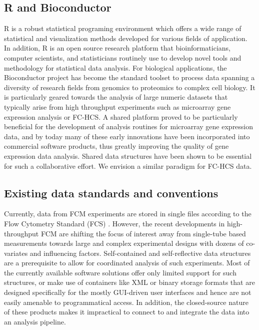 \documentclass[12pt]{article}
\begin{document}
\subsection*{R and Bioconductor}
R is a robust statistical programing environment which offers a wide
range of statistical and visualization methods developed for various
fields of application. In addition, R is an open source research %
platform that bioinformaticians, computer scientists, and
statisticians routinely use to develop novel tools and methodology for
statistical data analysis. For biological applications, the
Bioconductor project has become the standard toolset
\citep{gentleman2006bos} to process data spanning a diversity of
research fields from genomics to proteomics to complex cell
biology. It is particularly geared towards the analysis of large
numeric datasets that typically arise from high throughput experiments
such as microarray gene expression analysis or FC-HCS. A shared
platform proved to be particularly beneficial for the development of
analysis routines for microarray gene expression data, and by today
many of these early innovations have been incorporated into commercial
software products, thus greatly improving the quality of gene
expression data analysis. 
Shared data structures have been shown to be
essential for such a collaborative effort. We envision a similar
paradigm for FC-HCS data. 


\subsection*{Existing data standards and conventions}
Currently, data from FCM experiments are stored in single files
according to the Flow Cytometry Standard (FCS) \citep{seamer1997pnd}.
However, the recent
developments in high-throughput FCM are shifting the focus
of interest away from single-tube based measurements towards large and
complex experimental designs with dozens of co-variates and
influencing factors. Self-contained and self-reflective data
structures are a prerequisite to allow for coordinated analysis of
such experiments. Most of the currently available software solutions
offer only limited support for such structures, or make use of
containers like XML or binary storage formats that are designed
specifically for the mostly GUI-driven user interfaces and hence are
not easily amenable to programmatical access. In addition, the
closed-source nature of %
these products makes it impractical to
connect to and integrate the data into an analysis pipeline.
\end{document}
